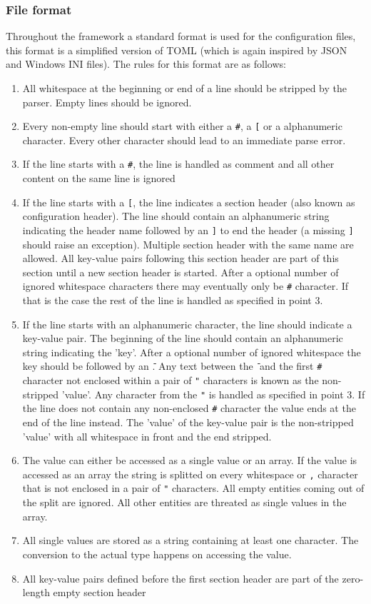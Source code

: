 \subsubsection{File format}
\label{sec:config_file_format}
Throughout the framework a standard format is used for the configuration files, this format is a simplified version of TOML\cite{tomlgit} (which is again inspired by JSON and Windows INI files). The rules for this format are as follows:
\begin{enumerate}
\item All whitespace at the beginning or end of a line should be stripped by the parser. Empty lines should be ignored.
\item Every non-empty line should start with either a \texttt{\#}, a \texttt{[} or a alphanumeric character. Every other character should lead to an immediate parse error.
\item If the line starts with a \texttt{\#}, the line is handled as comment and all other content on the same line is ignored
\item If the line starts with a \texttt{[}, the line indicates a section header (also known as configuration header). The line should contain an alphanumeric string indicating the header name followed by an \texttt{]} to end the header (a missing \texttt{]} should raise an exception). Multiple section header with the same name are allowed. All key-value pairs following this section header are part of this section until a new section header is started. After a optional number of ignored whitespace characters there may eventually only be \texttt{\#} character. If that is the case the rest of the line is handled as specified in point 3.
\item If the line starts with an alphanumeric character, the line should indicate a key-value pair. The beginning of the line should contain an alphanumeric string indicating the 'key'. After a optional number of ignored whitespace the key should be followed by an \texttt{\=}. Any text between the \texttt{\=} and the first \texttt{\#} character not enclosed within a pair of \texttt{"} characters is known as the non-stripped 'value'. Any character from the \texttt{"} is handled as specified in point 3. If the line does not contain any non-enclosed \texttt{\#} character the value ends at the end of the line instead. The 'value' of the key-value pair is the non-stripped 'value' with all whitespace in front and the end stripped.
\item The value can either be accessed as a single value or an array. If the value is accessed as an array the string is splitted on every whitespace or \texttt{,} character that is not enclosed in a pair of \texttt{"} characters. All empty entities coming out of the split are ignored. All other entities are threated as single values in the array.
\item All single values are stored as a string containing at least one character. The conversion to the actual type happens on accessing the value.
\item All key-value pairs defined before the first section header are part of the zero-length empty section header
\end{enumerate}

